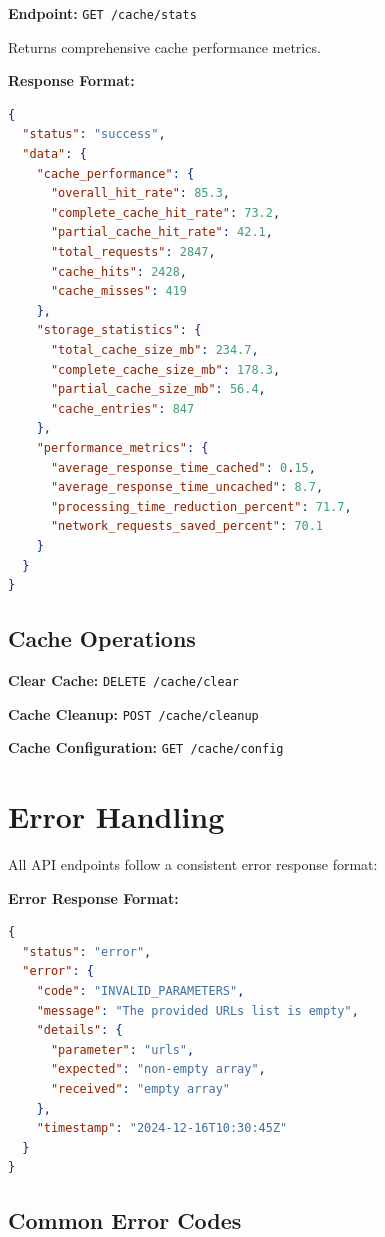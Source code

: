 \textbf{Endpoint:} \texttt{GET /cache/stats}

Returns comprehensive cache performance metrics.

\textbf{Response Format:}
\begin{lstlisting}[language=json]
{
  "status": "success",
  "data": {
    "cache_performance": {
      "overall_hit_rate": 85.3,
      "complete_cache_hit_rate": 73.2,
      "partial_cache_hit_rate": 42.1,
      "total_requests": 2847,
      "cache_hits": 2428,
      "cache_misses": 419
    },
    "storage_statistics": {
      "total_cache_size_mb": 234.7,
      "complete_cache_size_mb": 178.3,
      "partial_cache_size_mb": 56.4,
      "cache_entries": 847
    },
    "performance_metrics": {
      "average_response_time_cached": 0.15,
      "average_response_time_uncached": 8.7,
      "processing_time_reduction_percent": 71.7,
      "network_requests_saved_percent": 70.1
    }
  }
}
\end{lstlisting}

\subsection{Cache Operations}

\textbf{Clear Cache:} \texttt{DELETE /cache/clear}

\textbf{Cache Cleanup:} \texttt{POST /cache/cleanup}

\textbf{Cache Configuration:} \texttt{GET /cache/config}

\section{Error Handling}
\label{app:error_handling}

All API endpoints follow a consistent error response format:

\textbf{Error Response Format:}
\begin{lstlisting}[language=json]
{
  "status": "error",
  "error": {
    "code": "INVALID_PARAMETERS",
    "message": "The provided URLs list is empty",
    "details": {
      "parameter": "urls",
      "expected": "non-empty array",
      "received": "empty array"
    },
    "timestamp": "2024-12-16T10:30:45Z"
  }
}
\end{lstlisting}

\subsection{Common Error Codes}

